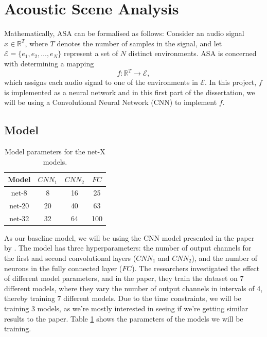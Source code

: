 \documentclass[logo,bsc,singlespacing,parskip,online]{infthesis}
\begin{document}


\section{Acoustic Scene Analysis}
Mathematically, ASA can be formalised as follows:
Consider an audio signal \(x \in \mathbb{R}^{T}\), where \(T\) denotes the number of samples in the signal, and let \(\mathcal{E} = \{e_1, e_2, \ldots, e_N\}\) represent a set of \(N\) distinct environments. ASA is concerned with determining a mapping 
\[
f: \mathbb{R}^{T} \rightarrow \mathcal{E},
\]
which assigns each audio signal to one of the environments in \(\mathcal{E}\). In this project, \(f\) is implemented as a neural network
and in this first part of the dissertation, we will be using a Convolutional Neural Network (CNN) to implement \(f\).

\subsection{Model}
\begin{table}[h]
   \centering
   \begin{tabular}{|c|c|c|c|}
      \hline
      Model & $CNN_1$ & $CNN_2$ & $FC$ \\
      \hline
      net-8 & 8 & 16 & 25 \\
      net-20 & 20 & 40 & 63 \\
      net-32 & 32 & 64 & 100 \\
      \hline
   \end{tabular}
   \caption{Model parameters for the net-X models.}
   \label{tab:cnn-model-params}
\end{table}
As our baseline model, we will be using the CNN model presented in the paper by \citet{Huwel2020HearDS}. 
The model has three hyperparameters: the number of output channels for the first and second convolutional layers ($CNN_1$ and $CNN_2$),
and the number of neurons in the fully connected layer ($FC$). The researchers investigated the effect of different model parameters, 
and in the paper, they train the dataset on 7 different models, where they vary the number of output channels in intervals of 4, thereby training 7 different models.
Due to the time constraints, we will be training 3 models, as we're mostly interested in seeing if we're getting similar results to the paper.
Table \ref{tab:cnn-model-params} shows the parameters of the models we will be training.
\end{document}
